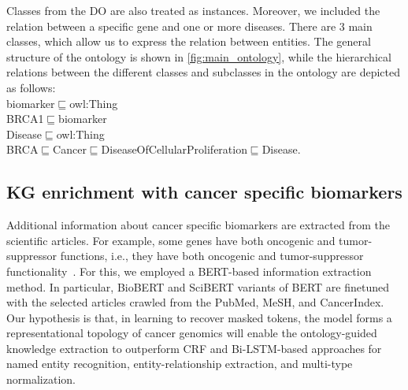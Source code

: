 \hspace*{3.5mm} Classes from the DO are also treated as instances. Moreover, we included  the relation between a specific gene and one or more diseases. There are 3 main classes, which allow us to express the relation between entities. The general structure of the ontology is shown in \cref{fig:main_ontology}, while the hierarchical relations between the different classes and subclasses in the ontology are depicted as follows: \\

\vspace{-4mm}
{\scriptsize \noindent biomarker$\sqsubseteq$owl:Thing \\
BRCA1$\sqsubseteq$biomarker\\
Disease$\sqsubseteq$owl:Thing\\
BRCA$\sqsubseteq$Cancer$\sqsubseteq$DiseaseOfCellularProliferation$\sqsubseteq$Disease.}\\
\vspace{-4mm}


\subsection{KG enrichment with cancer specific biomarkers} %
Additional information about cancer specific biomarkers are extracted from the scientific articles. For example, some genes have both oncogenic and tumor-suppressor functions, i.e., they have both oncogenic and tumor-suppressor functionality~\cite{POSTF}. For this, we employed a BERT-based information extraction method. In particular, BioBERT and SciBERT variants of BERT are finetuned with the selected articles crawled from the PubMed, MeSH, and CancerIndex. Our hypothesis is that, in learning to recover masked tokens, the model forms a representational topology of cancer genomics will enable the ontology-guided knowledge extraction to outperform CRF and Bi-LSTM-based approaches for named entity recognition, entity-relationship extraction, and multi-type normalization. 

